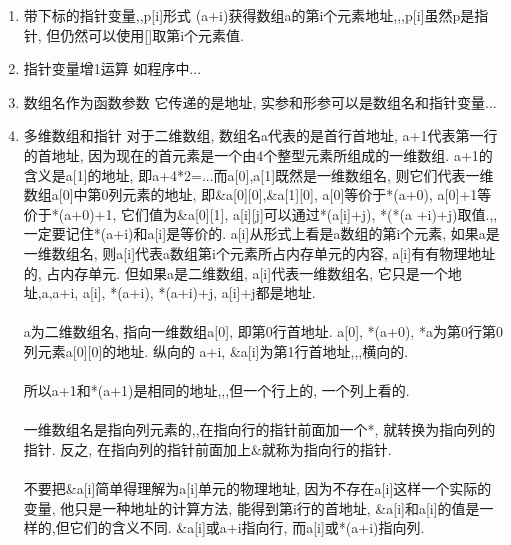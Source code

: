 \documentclass[a4paper,10pt,english]{article}
\begin{document}
\begin{enumerate}
\begin{enumerate}
\item {带下标的指针变量,,p[i]形式}
(a+i)获得数组a的第i个元素地址,,,p[i]虽然p是指针, 但仍然可以使用[]取第i个元素值.

\item {指针变量增1运算}
如程序中...

\item {数组名作为函数参数}
它传递的是地址, 实参和形参可以是数组名和指针变量...

\item {多维数组和指针}
对于二维数组, 数组名a代表的是首行首地址, a+1代表第一行的首地址, 因为现在的首元素是一个由4个整型元素所组成的一维数组. a+1的含义是a[1]的地址, 即a+4*2=...而a[0],a[1]既然是一维数组名, 则它们代表一维数组a[0]中第0列元素的地址, 即\&a[0][0],\&a[1][0], a[0]等价于*(a+0), a[0]+1等价于*(a+0)+1, 它们值为\&a[0][1], a[i][j]可以通过*(a[i]+j), *(*(a
+i)+j)取值.,,一定要记住*(a+i)和a[i]是等价的. a[i]从形式上看是a数组的第i个元素, 如果a是一维数组名, 则a[i]代表a数组第i个元素所占内存单元的内容, a[i]有有物理地址的, 占内存单元. 但如果a是二维数组, a[i]代表一维数组名, 它只是一个地址,a,a+i, a[i], *(a+i), *(a+i)+j, a[i]+j都是地址.\\\\
a为二维数组名, 指向一维数组a[0], 即第0行首地址. 
a[0], *(a+0), *a为第0行第0列元素a[0][0]的地址. 纵向的
a+i, \&a[i]为第1行首地址,,,横向的. \\\\
所以a+1和*(a+1)是相同的地址,,,但一个行上的, 一个列上看的. \\\\
一维数组名是指向列元素的,,在指向行的指针前面加一个*, 就转换为指向列的指针. 反之, 在指向列的指针前面加上$\&$就称为指向行的指针.\\\\
不要把\&a[i]简单得理解为a[i]单元的物理地址, 因为不存在a[i]这样一个实际的变量, 他只是一种地址的计算方法, 能得到第i行的首地址, \&a[i]和a[i]的值是一样的,但它们的含义不同. \&a[i]或a+i指向行, 而a[i]或*(a+i)指向列.\\
\end{enumerate}


\end{enumerate}
\end{document}
